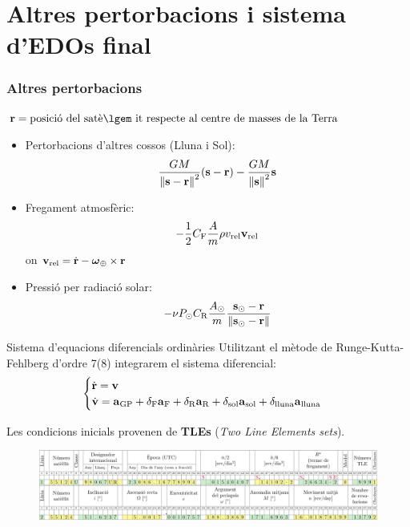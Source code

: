\documentclass{beamer} %
\begin{document}
\section{Altres pertorbacions i sistema d'EDOs final}
\begin{frame}
  \frametitle{Altres pertorbacions}
  $\vf{r} = \text{posició del satè\lgem it respecte al centre de masses de la Terra}$

  \vspace{0.25cm}
  \begin{itemize}
    \item<1-> Pertorbacions d'altres cossos (Lluna i Sol):
          $$\frac{GM}{\left\|\boldsymbol{\mathrm{s}}-\boldsymbol{\mathrm{r}}\right\|^2}(\boldsymbol{\mathrm{s}}-\boldsymbol{\mathrm{r}}) - \frac{GM}{\left\|\boldsymbol{\mathrm{s}}\right\|^2}\boldsymbol{\mathrm{s}}$$
    \item<2-> Fregament atmosfèric: $$-\frac{1}{2}C_\mathrm{F} \frac{A}{m}\rho v_\mathrm{rel}\boldsymbol{\mathrm{v}}_\mathrm{rel}$$
          on $\boldsymbol{\mathrm{v}}_\mathrm{rel}=\dot{\boldsymbol{\mathrm{r}}}-\boldsymbol{\mathrm{\omega}}_\oplus\times\boldsymbol{\mathrm{r}}$
    \item<3-> Pressió per radiació solar: $$
            -\nu P_\odot C_\mathrm{R} \frac{A_\odot}{m} \frac{\boldsymbol{\mathrm{s}}_\odot-\boldsymbol{\mathrm{r}}}{\left\|\boldsymbol{\mathrm{s}}_\odot-\boldsymbol{\mathrm{r}}\right\|}
          $$
  \end{itemize}
\end{frame}
\begin{frame}{Sistema d'equacions diferencials ordinàries}
  Utilitzant el mètode de Runge-Kutta-Fehlberg d'ordre 7(8) integrarem el sistema diferencial:
  \begin{equation*}
    \begin{cases}
      \dot{\boldsymbol{\mathrm{r}}}=\boldsymbol{\mathrm{v}} \\
      \dot{\boldsymbol{\mathrm{v}}}=\boldsymbol{\mathrm{a}}_{\mathrm{GP}} + \delta_{\mathrm{F}}\boldsymbol{\mathrm{a}}_{\mathrm{F}}+\delta_{\mathrm{R}}\boldsymbol{\mathrm{a}}_{\mathrm{R}}+\delta_{\mathrm{sol}}\boldsymbol{\mathrm{a}}_{\mathrm{sol}}+\delta_{\mathrm{lluna}}\boldsymbol{\mathrm{a}}_\mathrm{lluna}
    \end{cases}
  \end{equation*}
  \pause
  \vspace{0.25cm}

  Les condicions inicials provenen de \textbf{TLEs} (\emph{Two Line Elements sets}).
  \begin{figure}
    \centering
    \includegraphics[width=\textwidth]{../Images/TLE_ca.pdf}
  \end{figure}
\end{frame}
\end{document}
